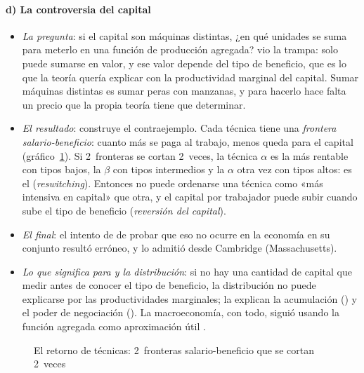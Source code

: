 \documentclass[11pt]{article}
\begin{document}
\paragraph{d) La controversia del capital}

\begin{itemize}
\item \emph{La pregunta}: si el capital son máquinas distintas, ¿en qué unidades se suma para meterlo en una función de producción agregada? \textcite{Robinson1953Production} vio la trampa: solo puede sumarse en valor, y ese valor depende del tipo de beneficio, que es lo que la teoría quería explicar con la productividad marginal del capital. Sumar máquinas distintas es sumar peras con manzanas, y para hacerlo hace falta un precio que la propia teoría tiene que determinar.
\item \emph{El resultado}: \textcite{Sraffa1960Production} construye el contraejemplo. Cada técnica tiene una \emph{frontera salario-beneficio}: cuanto más se paga al trabajo, menos queda para el capital (gráfico~\ref{fig:retorno-tecnicas}). Si 2~fronteras se cortan 2~veces, la técnica $\alpha$ es la más rentable con tipos bajos, la $\beta$ con tipos intermedios y la $\alpha$ otra vez con tipos altos: es el  (\emph{reswitching}). Entonces no puede ordenarse una técnica como «más intensiva en capital» que otra, y el capital por trabajador puede subir cuando sube el tipo de beneficio (\emph{reversión del capital}).
\item \emph{El final}: el intento de \textcite{Levhari1965Nonswitching} de probar que eso no ocurre en la economía en su conjunto resultó erróneo\nocite{LevhariSamuelson1966Nonswitching}, y \textcite{Samuelson1966Summing} lo admitió desde Cambridge (Massachusetts)\nocite{CohenHarcourt2003Whatever}.
\item \emph{Lo que significa para  y la distribución}: si no hay una cantidad de capital que medir antes de conocer el tipo de beneficio, la distribución no puede explicarse por las productividades marginales; la explican la acumulación () y el poder de negociación (). La macroeconomía, con todo, siguió usando la función agregada como aproximación útil  .
\end{itemize}

\begin{figure}[H]
\centering
\caption{El retorno de técnicas: 2~fronteras salario-beneficio que se cortan 2~veces}\label{fig:retorno-tecnicas}
\end{figure}
\end{document}
